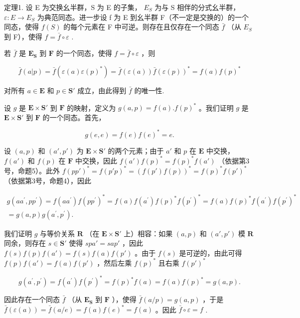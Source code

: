 定理1. 设 E 为交换幺半群，S 为 E 的子集， \(E_{S}\) 为与 S 相伴的分式幺半群， \(\varepsilon: E \to E_{S}\) 为典范同态。进一步设 f 为 E 到幺半群 F（不一定是交换的）的一个同态，使得 \(f(S)\) 的每个元素在 F 中可逆。则存在且仅存在一个同态 \(\bar{f}\) （从 \(E_{S}\) 到 F），使得 \(f = \bar{f} \circ \varepsilon\) .

若 \(\bar{f}\) 是 \(\mathbf{E}_{\mathbf{S}}\) 到 \(\mathbf{F}\) 的一个同态，使得 \(f = \bar{f} \circ \varepsilon\) ，则

\[
\bar {f} (a | p) = \bar {f} (\varepsilon (a) \varepsilon (p) ^ {*}) = \bar {f} (\varepsilon (a)) \bar {f} (\varepsilon (p)) ^ {*} = f (a) f (p) ^ {*}
\]

对所有 \(a \in \mathbf{E}\) 和 \(p \in \mathbf{S}'\) 成立，由此得到 \(\bar{f}\) 的唯一性.

设 \(g\) 是 \(\mathbf{E} \times \mathbf{S}'\) 到 \(\mathbf{F}\) 的映射，定义为 \(g(a, p) = f(a).f(p)^*\) 。我们证明 \(g\) 是 \(\mathbf{E} \times \mathbf{S}'\) 到 \(\mathbf{F}\) 的一个同态。首先，

\[
g (e, e) = f (e) f (e) ^ {*} = e.
\]

设 \((a, p)\) 和 \((a', p')\) 为 \(\mathbf{E} \times \mathbf{S}'\) 的两个元素；由于 \(a'\) 和 \(p\) 在 \(\mathbf{E}\) 中交换， \(f(a')\) 和 \(f(p)\) 在 \(\mathbf{F}\) 中交换，因此 \(f(a')f(p)^* = f(p)^*f(a')\) （依据第3号，命题5）。此外 \(f(p p')^* = f(p' p)^* = (f(p')f(p))^* = f(p)^*f(p')^*\) （依据第3号，命题4），因此

\[
\begin{array}{l} g (a a ^ {\prime}, p p ^ {\prime}) = f (a a ^ {\prime}) f (p p ^ {\prime}) ^ {*} = f (a) f (a ^ {\prime}) f (p) ^ {*} f (p ^ {\prime}) ^ {*} = f (a) f (p) ^ {*} f (a ^ {\prime}) f (p ^ {\prime}) ^ {*} \\ = g (a, p) g (a ^ {\prime}, p ^ {\prime}). \end{array}
\]

我们证明 \(g\) 与等价关系 \(\mathbf{R}\) （在 \(\mathbf{E} \times \mathbf{S}'\) 上）相容：如果 \((a, p)\) 和 \((a', p')\) 模 \(\mathbf{R}\) 同余，则存在 \(s \in \mathbf{S}'\) 使得 \(spa' = sap'\) ，因此 \(f(s)f(p)f(a') = f(s)f(a)f(p')\) 。由于 \(f(s)\) 是可逆的，由此可得 \(f(p)f(a') = f(a)f(p')\) ，然后左乘 \(f(p)^*\) 且右乘 \(f(p')^*\)

\[
g (a ^ {\prime}, p ^ {\prime}) = f (a ^ {\prime}) f (p ^ {\prime}) ^ {*} = f (p) ^ {*} f (a) = f (a) f (p) ^ {*} = g (a, p).
\]

因此存在一个同态 \(\bar{f}\) （从 \(\mathbf{E}_{\mathbf{S}}\) 到 \(\mathbf{F}\) ），使得 \(\bar{f}(a/p) = g(a,p)\) ，于是 \(\bar{f}(\varepsilon(a)) = \bar{f}(a/e) = f(a)f(e)^* = f(a)\) 。因此 \(\bar{f} \circ \varepsilon = f\) .

